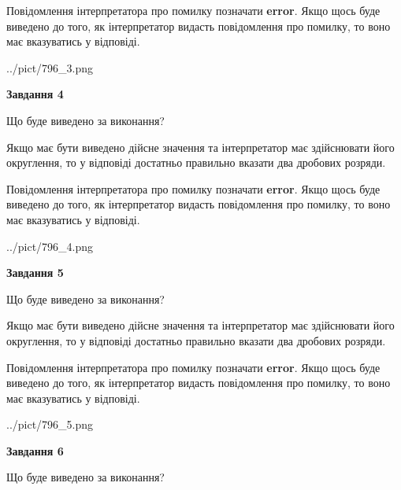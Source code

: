 \documentclass[12pt, ukrainian]{article}
\begin{document}
{\begin {Large}
Повідомлення інтерпретатора про помилку позначати \textbf{error}.
Якщо щось буде виведено до того, як інтерпретатор видасть повідомлення про помилку, 
то воно має вказуватись у відповіді. \par

\begin{center}
	{../pict/796_3.png}
\end{center}
\newpage

{\begin {center}\textbf{Завдання 4}\end {center}}\par
Що буде виведено за виконання? \par

Якщо має бути виведено дійсне значення та інтерпретатор має здійснювати його округлення, 
то у відповіді достатньо правильно вказати два дробових розряди.

Повідомлення інтерпретатора про помилку позначати \textbf{error}.
Якщо щось буде виведено до того, як інтерпретатор видасть повідомлення про помилку, 
то воно має вказуватись у відповіді. \par

\begin{center}
	{../pict/796_4.png}
\end{center}
\newpage

{\begin {center}\textbf{Завдання 5}\end {center}}\par
Що буде виведено за виконання? \par

Якщо має бути виведено дійсне значення та інтерпретатор має здійснювати його округлення, 
то у відповіді достатньо правильно вказати два дробових розряди.

Повідомлення інтерпретатора про помилку позначати \textbf{error}.
Якщо щось буде виведено до того, як інтерпретатор видасть повідомлення про помилку, 
то воно має вказуватись у відповіді. \par

\begin{center}
	{../pict/796_5.png}
\end{center}
\newpage

{\begin {center}\textbf{Завдання 6}\end {center}}\par
Що буде виведено за виконання? \par


\end{Large}}
\end{document}
